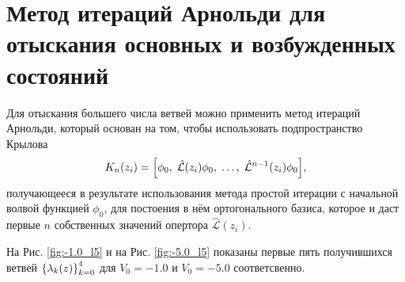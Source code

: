 \documentclass[10pt]{article}
\begin{document}
\section{Метод итераций Арнольди для отыскания основных и возбужденных состояний}

Для отыскания большего числа ветвей можно применить метод итераций Арнольди, который основан на том, чтобы использовать подпространство Крылова
$$
K_n(z_i) = \qty[\phi_0,\; \hat{\mathcal{L}}(z_i)\phi_0,\; \ldots,\; \hat{\mathcal{L}}^{n-1}(z_i)\phi_0],
$$
получающееся в результате использования метода простой итерации с начальной волвой функцией $\phi_0$, для постоения в нём ортогонального базиса, которое и даст первые $n$ собственных значений опертора $\hat{\mathcal{L}}(z_i)$.

На Рис. \ref{fig:-1.0_l5} и на Рис. \ref{fig:-5.0_l5} показаны первые пять получившихся ветвей $\qty{\lambda_k(z)}_{k=0}^4$ для $V_0 = -1.0$ и $V_0=-5.0$ соответсвенно.
\end{document}
